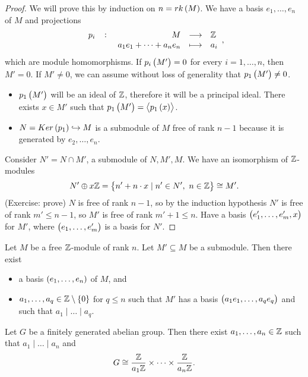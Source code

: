 \begin{proof}
We will prove this by induction on $ n = rk\br{M} $. We have a basis $ e_1, \dots, e_n $ of $ M $ and projections
$$ \function[p_i]{M}{\Z}{a_1e_1 + \dots + a_ne_n}{a_i}, $$
which are module homomorphisms. If $ p_i\br{M'} = 0 $ for every $ i = 1, \dots, n $, then $ M' = 0 $. If $ M' \ne 0 $, we can assume without loss of generality that $ p_1\br{M'} \ne 0 $.
\begin{itemize}
\item $ p_1\br{M'} $ will be an ideal of $ \mathbb{Z} $, therefore it will be a principal ideal. There exists $ x \in M' $ such that $ p_1\br{M'} = \abr{p_1\br{x}} $.
\item $ N = Ker\br{p_1} \hookrightarrow M $ is a submodule of $ M $ free of rank $ n - 1 $ because it is generated by $ e_2, \dots, e_n $.
\end{itemize}
Consider $ N' = N \cap M' $, a submodule of $ N, M', M $. We have an isomorphism of $ \mathbb{Z} $-modules
$$ N' \oplus x\Z = \cbr{n' + n \cdot x \mid n' \in N', \ n \in \Z} \cong M'. $$
(Exercise: prove) $ N $ is free of rank $ n - 1 $, so by the induction hypothesis $ N' $ is free of rank $ m' \le n - 1 $, so $ M' $ is free of rank $ m' + 1 \le n $. Have a basis $ \br{e_1', \dots, e_m', x} $ for $ M' $, where $ \br{e_1, \dots, e_m'} $ is a basis for $ N' $.
\end{proof}

\begin{theorem}
\label{thm:structure}
Let $ M $ be a free $ \mathbb{Z} $-module of rank $ n $. Let $ M' \subseteq M $ be a submodule. Then there exist
\begin{itemize}
\item a basis $ \br{e_1, \dots, e_n} $ of $ M $, and
\item $ a_1, \dots, a_q \in \Z \setminus \cbr{0} $ for $ q \le n $ such that $ M' $ has a basis $ \br{a_1e_1, \dots, a_qe_q} $ and such that $ a_1 \mid \dots \mid a_q $.
\end{itemize}
\end{theorem}

\begin{corollary}
\label{cor:structure}
Let $ G $ be a finitely generated abelian group. Then there exist $ a_1, \dots, a_n \in \mathbb{Z} $ such that $ a_1 \mid \dots \mid a_n $ and
$$ G \cong \dfrac{\mathbb{Z}}{a_1\mathbb{Z}} \times \dots \times \dfrac{\mathbb{Z}}{a_n\mathbb{Z}}. $$
\end{corollary}


